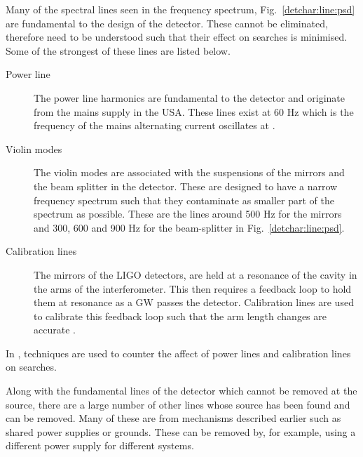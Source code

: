 %

Many of the spectral lines seen in the frequency spectrum, Fig.~\ref{detchar:line:psd} are fundamental to the design of the detector. 
These cannot be eliminated, therefore need to be understood such that their effect on searches is minimised.
Some of the strongest of these lines are listed below.
\begin{description}
	\item[Power line] The power line harmonics are fundamental to the detector and originate from the mains supply in the USA. These lines exist at 60 Hz which is the frequency of the mains alternating current oscillates at \citep{aasi2015CharacterizationLIGO}.
	
	\item[Violin modes] The violin modes are associated with the suspensions of the mirrors and the beam splitter in the detector. These are designed to have a narrow frequency spectrum such that they contaminate as smaller part of the spectrum as possible. These are the lines around 500 Hz for the mirrors and 300, 600 and 900 Hz for the beam-splitter \citep{GWOpen} in Fig.~\ref{detchar:line:psd}.
	
	\item[Calibration lines] The mirrors of the \ac{LIGO} detectors, are held at a resonance of the cavity in the arms of the interferometer. This then requires a feedback loop to hold them at resonance as a \ac{GW} passes the detector. Calibration lines are used to calibrate this feedback loop such that the arm length changes are accurate \citep{tuyenbayev2016ImprovingLIGO,coughlin2010NoiseLine}.
\end{description}
In \citep{davis2019ImprovingSensitivity}, techniques are used to counter the affect of power lines and calibration lines on searches. 

Along with the fundamental lines of the detector which cannot be removed at the source, there are a large number of other lines whose source has been found and can be removed. 
Many of these are from mechanisms described earlier such as shared power supplies or grounds. These can be removed by, for example, using a different power supply for different systems.

%

